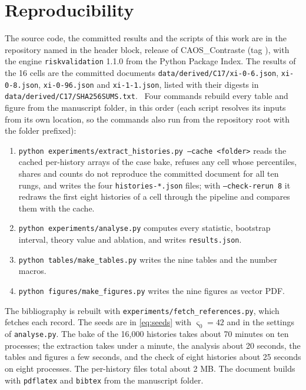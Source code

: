 \section{Reproducibility}
\label{sec:reproducibility}

The source code, the committed results and the scripts of this work are in the repository named in the header block, release \docversion{} of CAOS\_Contraste (tag \docversion{}), with the engine \texttt{riskvalidation} 1.1.0 from the Python Package Index. The results of the 16 cells are the committed documents \texttt{data/derived/C17/xi-0-6.json}, \texttt{xi-0-8.json}, \texttt{xi-0-96.json} and \texttt{xi-1-1.json}, listed with their digests in \texttt{data/derived/C17/SHA256SUMS.txt}.\ %
Four commands rebuild every table and figure from the manuscript folder, in this order (each script resolves its inputs from its own location, so the commands also run from the repository root with the folder prefixed):
\begin{enumerate}
\item \texttt{python experiments/extract\_histories.py --cache <folder>} reads the cached per-history arrays of the case bake, refuses any cell whose percentiles, shares and counts do not reproduce the committed document for all ten rungs, and writes the four \texttt{histories-*.json} files; with \texttt{--check-rerun 8} it redraws the first eight histories of a cell through the pipeline and compares them with the cache.
\item \texttt{python experiments/analyse.py} computes every statistic, bootstrap interval, theory value and ablation, and writes \texttt{results.json}.
\item \texttt{python tables/make\_tables.py} writes the nine tables and the number macros.
\item \texttt{python figures/make\_figures.py} writes the nine figures as vector PDF.
\end{enumerate}
The bibliography is rebuilt with \texttt{experiments/fetch\_references.py}, which fetches each record. The seeds are in \cref{eq:seeds} with $\varsigma_0=42$ and in the settings of \texttt{analyse.py}. The bake of the 16{,}000 histories takes about 70 minutes on ten processes; the extraction takes under a minute, the analysis about 20 seconds, the tables and figures a few seconds, and the check of eight histories about 25 seconds on eight processes.
The per-history files total about 2 MB. The document builds with \texttt{pdflatex} and \texttt{bibtex} from the manuscript folder.
